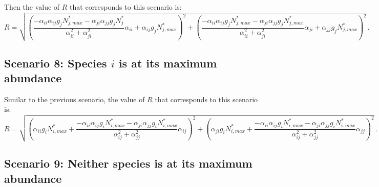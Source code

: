 \begin{refsection}
Then the value of $R$ that corresponds to this scenario is:
\begin{equation}
\label{scenario7}
  R = \sqrt{(\frac{- \alpha_{ii}\alpha_{ij}g_{j}N_{j,max}^{*} - \alpha_{ji}\alpha_{jj}g_{j}N_{j}^{*}}{\alpha_{ii}^2 + \alpha_{ji}^2}\alpha_{ii} + \alpha_{ij}g_{j}N_{j,max}^{*} )^2 + (\frac{- \alpha_{ii}\alpha_{ij}g_{j}N_{j,max}^{*} - \alpha_{ji}\alpha_{jj}g_{j}N_{j,max}^{*}}{\alpha_{ii}^2 + \alpha_{ji}^2}\alpha_{ji} + \alpha_{jj}g_{j}N_{j,max}^{*} )^2} \,.
\end{equation}


\subsection*{Scenario 8: Species $i$ is at its maximum abundance}

Similar to the previous scenario, the value of $R$ that corresponds to this scenario is:
\begin{equation}
\label{scenario8}
   R = \sqrt{(\alpha_{ii}g_{i}N_{i,max}^{*} + \frac{-\alpha_{ii}\alpha_{ij}g_{i}N_{i,max}^{*} - \alpha_{ji}\alpha_{jj}g_{i}N_{i,max}^{*}}{\alpha_{ij}^{2} + \alpha_{jj}^{2}}\alpha_{ij} )^2 + (\alpha_{ji}g_{i}N_{i,max}^{*} + \frac{-\alpha_{ii}\alpha_{ij}g_{i}N_{i,max}^{*} - \alpha_{ji}\alpha_{jj}g_{i}N_{i,max}^{*}}{\alpha_{ij}^{2} + \alpha_{jj}^{2}}\alpha_{jj} )^2} \,.
\end{equation}


\subsection*{Scenario 9: Neither species is at its maximum abundance}


\end{refsection}
